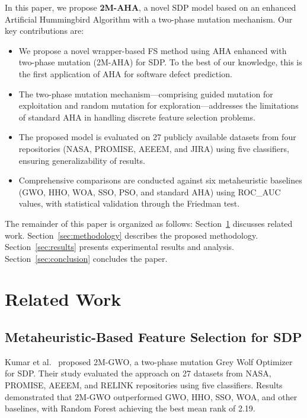 \documentclass[conference,twocolumn]{IEEEtran}
\begin{document}
In this paper, we propose \textbf{2M-AHA}, a novel SDP model based on an enhanced Artificial Hummingbird Algorithm with a two-phase mutation mechanism. Our key contributions are:

\begin{itemize}
    \item We propose a novel wrapper-based FS method using AHA enhanced with two-phase mutation (2M-AHA) for SDP. To the best of our knowledge, this is the first application of AHA for software defect prediction.
    \item The two-phase mutation mechanism---comprising guided mutation for exploitation and random mutation for exploration---addresses the limitations of standard AHA in handling discrete feature selection problems.
    \item The proposed model is evaluated on 27 publicly available datasets from four repositories (NASA, PROMISE, AEEEM, and JIRA) using five classifiers, ensuring generalizability of results.
    \item Comprehensive comparisons are conducted against six metaheuristic baselines (GWO, HHO, WOA, SSO, PSO, and standard AHA) using ROC\_AUC values, with statistical validation through the Friedman test.
\end{itemize}

The remainder of this paper is organized as follows: Section~\ref{sec:related} discusses related work. Section~\ref{sec:methodology} describes the proposed methodology. Section~\ref{sec:results} presents experimental results and analysis. Section~\ref{sec:conclusion} concludes the paper.

\section{Related Work}\label{sec:related}

\subsection{Metaheuristic-Based Feature Selection for SDP}

Kumar et al.~\cite{kumar2024two} proposed 2M-GWO, a two-phase mutation Grey Wolf Optimizer for SDP. Their study evaluated the approach on 27 datasets from NASA, PROMISE, AEEEM, and RELINK repositories using five classifiers. Results demonstrated that 2M-GWO outperformed GWO, HHO, SSO, WOA, and other baselines, with Random Forest achieving the best mean rank of 2.19.
\end{document}
